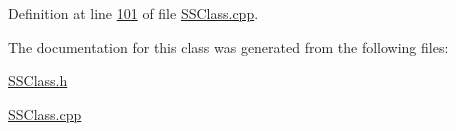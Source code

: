 Definition at line \hyperlink{SSClass_8cpp_source_l00101}{101} of file \hyperlink{SSClass_8cpp_source}{S\+S\+Class.\+cpp}.



The documentation for this class was generated from the following files\+:\begin{DoxyCompactItemize}
\item 
\hyperlink{SSClass_8h}{S\+S\+Class.\+h}\item 
\hyperlink{SSClass_8cpp}{S\+S\+Class.\+cpp}\end{DoxyCompactItemize}
